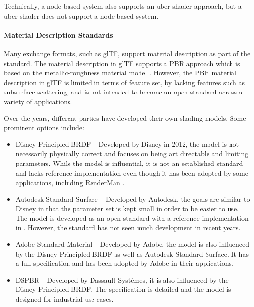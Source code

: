 Technically, a node-based system also supports an \gls{uber shader} approach, but a \gls{uber shader} does not support a node-based system.

\paragraph{Material Description Standards}
\label{ch:materialDescriptionStandards}

Many exchange formats, such as \gls{glTF}, support material description as part of the standard. The material description in \gls{glTF} supports a \gls{PBR} approach which is based on the metallic-roughness material model \cite{gltfSpecification}. However, the \gls{PBR} material description in \gls{glTF} is limited in terms of feature set, by lacking features such as subsurface scattering, and is not intended to become an open standard across a variety of applications.

Over the years, different parties have developed their own shading models. Some prominent options include:

\begin{itemize}
    \item{Disney Principled BRDF} \cite{disney2012pbr} – Developed by Disney in 2012, the model is not necessarily physically correct and focuses on being art directable and limiting parameters. While the model is influential, it is not an established standard and lacks reference implementation even though it has been adopted by some applications, including \gls{RenderMan} \cite{renderManDisneyPbrDocs}.
    \item{Autodesk Standard Surface} \cite{autodeskStandardSurface} – Developed by Autodesk, the goals are similar to Disney in that the parameter set is kept small in order to be easier to use. The model is developed as an open standard with a reference implementation in . However, the standard has not seen much development in recent years.
    \item{Adobe Standard Material} \cite{adobeStandardMaterial} – Developed by Adobe, the model is also influenced by the Disney Principled BRDF as well as Autodesk Standard Surface. It has a full specification and has been adopted by Adobe in their applications.
    \item{\gls{DSPBR}} \cite{dspbrModel} – Developed by Dassault Systèmes, it is also influenced by the Disney Principled BRDF. The specification is detailed and the model is designed for industrial use cases.
\end{itemize}

